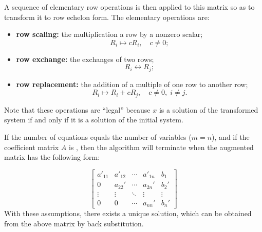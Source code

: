 \documentclass{article}
\begin{document}
A sequence of elementary row operations is then applied to this matrix
so as to transform it to row echelon form. The elementary operations are:
\begin{itemize}
\item \textbf{row scaling:} the multiplication a row by a nonzero
  scalar;
\[ R_i \mapsto c R_i,\quad c\neq 0;\]
\item \textbf{row exchange:} the  exchanges of two rows;
  \[ R_i \leftrightarrow R_j;\]
\item \textbf{row replacement:} the  addition of a multiple of one row to
  another row;
  \[ R_i \mapsto R_i + c R_j,\quad c\neq 0,\; i\neq j.\]
\end{itemize}
Note that these operations are ``legal'' because $x$ is a solution of
the transformed system if and only if it is a solution of the initial system.

If the number of equations equals the number of variables ($m=n$), and
if the coefficient matrix $A$ is , then the algorithm will
terminate when the augmented matrix has the following form:

$$ \begin{bmatrix}
a'_{11} & a'_{12} & \cdots & a'_{1n} & b_1 \\
0 & a_{22}' & \cdots & a_{2n}' & b_2' \\
\vdots & \vdots & \ddots & \vdots & \vdots \\
0 & 0 & \cdots & a_{nn}' & b_n'
\end{bmatrix} $$
With these assumptions, there exists a unique solution, which can be
obtained from the above matrix by back substitution.



\end{document}

